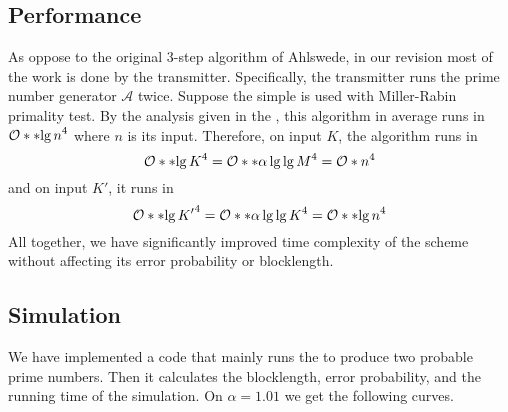 \subsection{Performance}
As oppose to the original 3-step algorithm of Ahlswede, in our revision most of the work is done by the transmitter. Specifically, the transmitter runs the prime number generator \(\mathcal{A}\) twice. Suppose the simple  is used with Miller-Rabin primality test. By the analysis given in the , this algorithm in average runs in \(\bigO{\bracket{\lg n}^4}\) where \(n\) is its input. Therefore, on input \(K\), the algorithm runs in 
\begin{equation*}
    \bigO{\bracket{\lg K}^4} = \bigO{\bracket{\alpha \lg \lg M }^4} = \bigO{n^4}
\end{equation*}
and on input \(K'\), it runs in 
\begin{equation*}
    \bigO{\bracket{\lg K'}^4} = \bigO{\bracket{\alpha \lg \lg K }^4} = \bigO{\bracket{\lg n}^4}
\end{equation*}
All together, we have significantly improved time complexity of the scheme without affecting its error probability or blocklength. 
\subsection{Simulation}
We have implemented a code that mainly runs the  to produce two probable prime numbers. Then it calculates the blocklength, error probability, and the running time of the simulation. On \(\alpha = 1.01\) we get the following curves.
\newpage